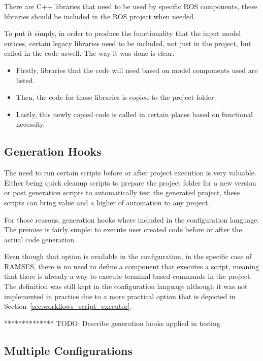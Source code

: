 There are C++ libraries that need to be used by specific \gls{ROS} components, these libraries should be included in the \gls{ROS} project when needed.

To put it simply, in order to produce the functionality that the input model entices, certain legacy libraries need to be included, not just in the project, but called in the code aswell. The way it was done is clear:

\begin{itemize} 
	\item Firstly, libraries that the code will need based on model components used are listed.
	\item Then, the code for those libraries is copied to the project folder.
	\item Lastly, this newly copied code is called in certain places based on functional necessity.
\end{itemize}

\subsection{Generation Hooks}
\label{sec:impl_gen_hooks}

The need to run certain scripts before or after project execution is very valuable. Either being quick cleanup scripts to prepare the project folder for a new version or post generation scripts to automatically test the generated project, these scripts can bring value and a higher of automation to any project.

For those reasons, generation hooks where included in the configuration language. The premise is fairly simple: to execute user created code before or after the actual code generation.

Even though that option is available in the configuration, in the specific case of \gls{RAMSES}, there is no need to define a component that executes a script, meaning that there is already a way to execute terminal based commands in the project. The definition was still kept in the configuration language although it was not implemented in practice due to a more practical option that is depicted in Section~\ref{sec:workflows_script_executor}.

************** TODO: Describe generation hooks applied in testing

\subsection{Multiple Configurations}
\label{sec:impl_multi_config}

